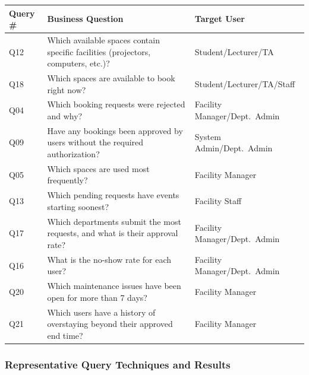 \begin{table}[H]
	\centering
	\begin{tabularx}{\textwidth}{|l|X|X|}
		\hline
		\textbf{Query \#} & \textbf{Business Question}                                                        & \textbf{Target User}          \\
		\hline
		Q12               & Which available spaces contain specific facilities (projectors, computers, etc.)? & Student/Lecturer/TA           \\
		\hline
		Q18               & Which spaces are available to book right now?                                     & Student/Lecturer/TA/Staff     \\
		\hline
		Q04               & Which booking requests were rejected and why?                                     & Facility Manager/Dept.\ Admin \\
		\hline
		Q09               & Have any bookings been approved by users without the required authorization?      & System Admin/Dept.\ Admin     \\
		\hline
		Q05               & Which spaces are used most frequently?                                            & Facility Manager              \\
		\hline
		Q13               & Which pending requests have events starting soonest?                              & Facility Staff                \\
		\hline
		Q17               & Which departments submit the most requests, and what is their approval rate?      & Facility Manager/Dept.\ Admin \\
		\hline
		Q16               & What is the no-show rate for each user?                                           & Facility Manager/Dept.\ Admin \\
		\hline
		Q20               & Which maintenance issues have been open for more than 7 days?                     & Facility Manager              \\
		\hline
		Q21               & Which users have a history of overstaying beyond their approved end time?         & Facility Manager              \\
		\hline
	\end{tabularx}
\end{table}

\subsubsection{Representative Query Techniques and Results}

